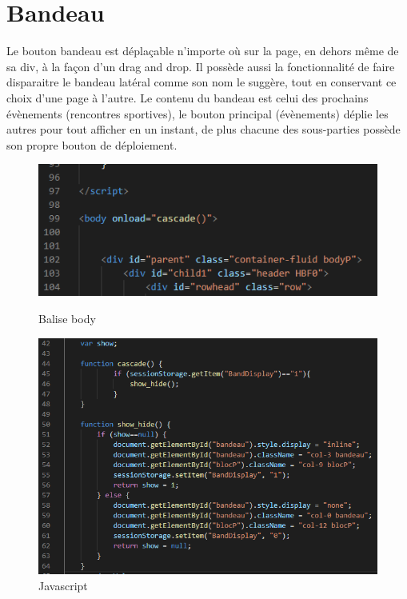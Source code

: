 \documentclass[12pt]{report}
\begin{document}
	    \section {Bandeau}
	    \hypertarget{annexe-bandeau}{}
\par
Le bouton bandeau est déplaçable n’importe où sur la page, en dehors même de sa div, à la façon d’un drag and drop. Il possède aussi la fonctionnalité de faire disparaitre le bandeau latéral comme son nom le suggère, tout en conservant ce choix d’une page à l’autre. Le contenu du bandeau est celui des prochains évènements (rencontres sportives), le bouton principal (évènements) déplie les autres pour tout afficher en un instant, de plus chacune des sous-parties possède son propre bouton de déploiement.
\bigskip

\begin{figure}
\hypertarget{fig-balise-body}{}
\includegraphics[width=0.95\linewidth]{figures/pt-balisebody.png}
\caption{Balise body}
\hypertarget{fig-js}{}
\includegraphics[width=0.95\linewidth]{figures/pt-js.png}
\caption{Javascript}
\hypertarget{fig-bouton-bandeau}{}

\end{figure}
\end{document}
